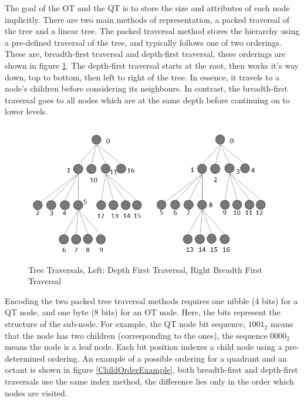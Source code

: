The goal of the OT and the QT is to store the size and attributes of each node implicitly. There are two main methods of representation, a packed traversal of the tree and a linear tree. The packed traversal method stores the hierarchy using a pre-defined traversal of the tree, and typically follows one of two orderings. These are, breadth-first traversal and depth-first traversal, these orderings are shown in figure \ref{TreeTraversalExample}. The depth-first traversal starts at the root, then works it's way down, top to bottom, then left to right of the tree. In essence, it travels to a node's children before considering its neighbours. In contrast, the breadth-first traversal goes to all nodes which are at the same depth before continuing on to lower levels. \\


\begin{figure}[!htb]
\centering
\includegraphics[width=12cm]{images/ch2/TreeTraversalExample}
\caption{Tree Traversals, Left: Depth First Traversal, Right Breadth First Traversal}
\label{TreeTraversalExample}
\end{figure}

Encoding the two packed tree traversal methods requires one nibble (4 bits) for a QT node, and one byte (8 bits) for an OT node. Here, the bits represent the structure of the sub-node. For example, the QT node bit sequence, $1001_2$ means that the node has two children (corresponding to the ones), the sequence $0000_2$ means the node is a leaf node. Each bit position indexes a child node using a pre-determined ordering. An example of a possible ordering for a quadrant and an octant is shown in figure \ref{ChildOrderExample}, both breadth-first and depth-first traversals use the same index method, the difference lies only in the order which nodes are visited. 

